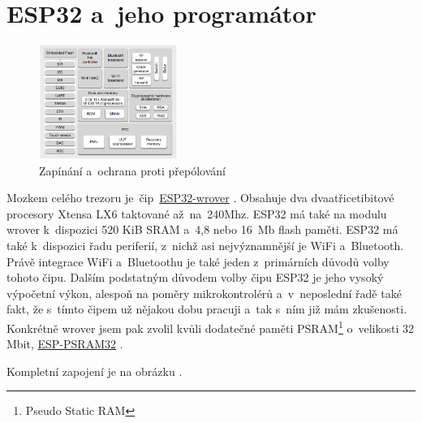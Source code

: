\section{ESP32 a~jeho programátor}
\label{ESP32}

\begin{figure}
    \centering
    \includegraphics[width=0.4\textwidth]{kapitoly/obrazky/E4/ESP32/BlockDiagram.png}
    \caption{\label{fig:E4-ESP32-BlockDiagram}Zapínání a~ochrana proti přepólování \centering}
\end{figure}

Mozkem celého trezoru je~čip~\href{https://www.espressif.com/sites/default/files/documentation/esp32-wrover-b_datasheet_en.pdf}{ESP32-wrover} \parencite{ESP32-WROVER-B}. 
Obsahuje dva dva\-a\-tři\-ce\-ti\-bi\-to\-vé procesory Xtensa LX6 taktované až~na~240Mhz. ESP32 \parencite{ESP32} má také na modulu wrover k~dispozici 520 KiB SRAM 
a~4,8 nebo 16~Mb flash paměti. ESP32 má také k~dispozici řadu periferií, z~nichž asi nejvýznamnější je WiFi a~Bluetooth. Právě integrace 
WiFi a~Bluetoothu je také jeden z~primárních důvodů volby tohoto čipu. Dalším podstatným důvodem volby čipu ESP32 je jeho vysoký výpočetní výkon, 
alespoň na poměry mikrokontrolérů a~v~neposlední řadě také fakt, že s~tímto čipem už nějakou dobu pracuji a~tak s~ním již mám zkušenosti. 
Konkrétně wrover jsem pak zvolil kvůli dodatečné paměti PSRAM\footnote{Pseudo Static RAM} o~velikosti 32 Mbit, 
\href{http://gamma.spb.ru/images/pdf/esp-psram32_datasheet_en.pdf}{ESP-PSRAM32} \parencite{ESP-PSRAM32}.

Kompletní zapojení je na obrázku .

\enlargethispage{10mm}

